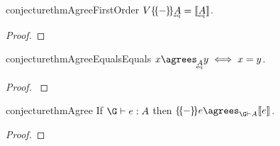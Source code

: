 \begin{restatable}{conjecture}{thmAgreeFirstOrder}
  \label{thm:agree-first-order}
  \( \vals{\incdens{\eqt A}} = \den{\eqt A} \).
\end{restatable}
\begin{proof}
\end{proof}

\begin{restatable}{conjecture}{thmAgreeEqualsEquals}
  \(x \agrees_{\eqt A} y \iff x = y\).
\end{restatable}
\begin{proof}
  \label{thm:agree-equals-equals}
\end{proof}

\begin{restatable}{conjecture}{thmAgree}
  If $\J e \G A$
  then $\incdens{e} \agrees_{\G \vdash A} \den{e}$.
\end{restatable}
\begin{proof}
\end{proof}




